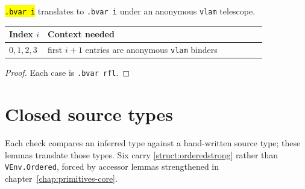 \begin{lemma}
  \label{prim-cond:family:trexprs-bvars}
  \leanok

   \hl{\texttt{.bvar i}} translates to \texttt{.bvar i} under an anonymous
  \texttt{vlam} telescope.
  \begin{center}
  \par\smallskip\noindent
\begin{tabular}{lp{0.85\linewidth}}
  \toprule
  Index $i$ & Context needed \\
  \midrule
  $0,1,2,3$ & first $i+1$ entries are anonymous \texttt{vlam} binders \\
  \bottomrule
  \end{tabular}\par\smallskip
  \end{center}
\end{lemma}
\begin{proof}
  \leanok
   Each case is \texttt{.bvar rfl}.
\end{proof}

\section{Closed source types}

Each check compares an inferred type against a hand-written source type; these lemmas translate
those types. Six carry \ref{struct:orderedstrong} rather than \texttt{VEnv.Ordered}, forced by
accessor lemmas strengthened in chapter~\ref{chap:primitives-core}.

